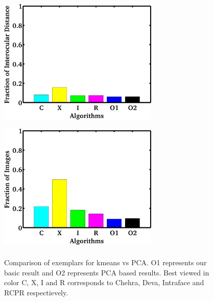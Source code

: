 \begin{figure}
  \centering
  \includegraphics[width=3.0in,height=2.5in]{fid/figures/iccv_version_one/cofw/kmeans_shape_vs_kmeans_pca/mean_err_modified.jpg}
  \includegraphics[width=3.0in,height=2.5in]{fid/figures/iccv_version_one/cofw/kmeans_shape_vs_kmeans_pca/fail_rate_modified.jpg}
  \caption{ Comparison of exemplars for kmeans vs PCA. O1 represents our basic result and O2
  represents PCA based results. Best viewed in color 
  C, X, I and R corresponds to Chehra, Deva, Intraface and RCPR respectievely. }
  \label{fig:kmeans_vs_pca}
\end{figure}
% 
% 

